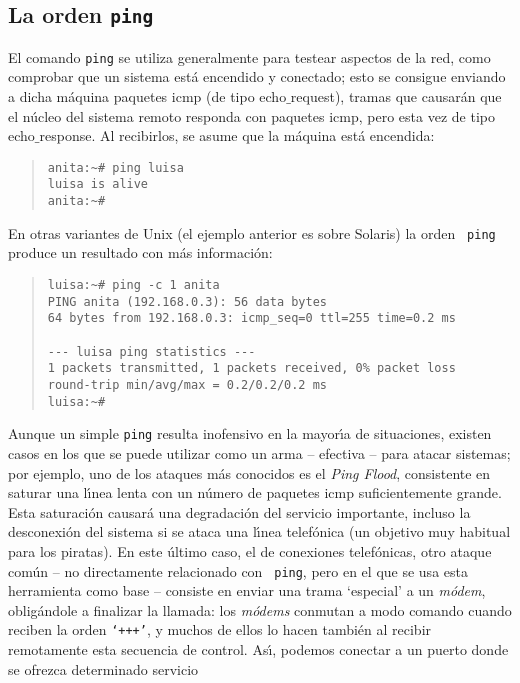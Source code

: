 \subsection{La orden {\tt ping}}
El comando {\tt ping} se utiliza generalmente para testear aspectos de la
red, como comprobar que un sistema est\'a encendido y conectado; esto se 
consigue enviando a dicha 
m\'aquina paquetes {\sc icmp} (de tipo {\sc echo$\_$request}), tramas que 
causar\'an que el n\'ucleo del sistema remoto responda con paquetes {\sc icmp},
pero esta vez de tipo {\sc echo$\_$response}. Al recibirlos, se asume que 
la m\'aquina est\'a encendida:
\begin{quote} 
\begin{verbatim} 
anita:~# ping luisa
luisa is alive
anita:~#
\end{verbatim} 
\end{quote} 
En otras variantes de Unix (el ejemplo anterior es sobre Solaris) la orden {\tt 
ping} produce un resultado con m\'as informaci\'on:
\begin{quote}
\begin{verbatim}
luisa:~# ping -c 1 anita
PING anita (192.168.0.3): 56 data bytes
64 bytes from 192.168.0.3: icmp_seq=0 ttl=255 time=0.2 ms

--- luisa ping statistics ---
1 packets transmitted, 1 packets received, 0% packet loss
round-trip min/avg/max = 0.2/0.2/0.2 ms
luisa:~#
\end{verbatim}
\end{quote}
Aunque un simple {\tt ping} resulta inofensivo en la mayor\'{\i}a de 
situaciones, existen casos en los que se puede utilizar como un arma -- 
efectiva -- para atacar sistemas; por ejemplo, uno de los ataques m\'as 
conocidos es el {\it Ping Flood}, consistente en saturar una l\'{\i}nea lenta 
con un n\'umero de paquetes {\sc icmp} suficientemente grande. Esta 
saturaci\'on causar\'a una degradaci\'on del servicio importante, incluso la
desconexi\'on del sistema si se ataca una l\'{\i}nea telef\'onica (un objetivo
muy habitual para los piratas). En este \'ultimo caso, el de conexiones 
telef\'onicas, otro ataque com\'un -- no directamente relacionado con {\tt
ping}, pero en el que se usa esta herramienta como base -- consiste en enviar
una trama `especial' a un {\it m\'odem}, oblig\'andole a finalizar la llamada:
los {\it m\'odems} conmutan a modo comando cuando reciben la orden {\tt `+++'}, 
y muchos de ellos lo hacen tambi\'en al recibir remotamente esta secuencia de 
control. 
As\'{\i}, podemos conectar a un puerto donde se ofrezca determinado servicio
